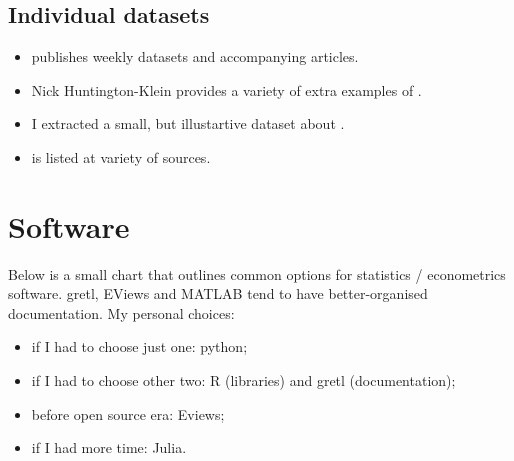 \documentclass[letterpaper,10pt,english]{sphinxmanual}
\begin{document}
\section{Individual datasets}
\label{\detokenize{data:individual-datasets}}\begin{itemize}
\item {} 
 publishes weekly
datasets and accompanying articles.

\item {} 
Nick Huntington-Klein provides a variety of extra examples of .

\item {} 
I extracted a small, but illustartive dataset about .

\item {} 
 is listed at variety of sources.

\end{itemize}


\chapter{Software}
\label{\detokenize{software:software}}\label{\detokenize{software::doc}}
Below is a small chart that outlines common options for statistics / econometrics software.
gretl, EViews and MATLAB tend to have better-organised documentation. My personal choices:
\begin{itemize}
\item {} 
if I had to choose just one: python;

\item {} 
if I had to choose other two: R (libraries) and gretl (documentation);

\item {} 
before open source era: Eviews;

\item {} 
if I had more time: Julia.

\end{itemize}
\end{document}
